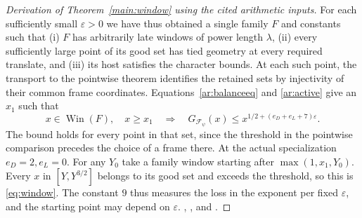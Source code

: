 \begin{proof}[Derivation of Theorem~\ref{main:window} using the cited arithmetic inputs]
For each sufficiently small \(\varepsilon>0\) we have thus obtained a single family \(F\) and constants such that (i) \(F\) has arbitrarily late windows of power length \(\lambda\), (ii) every sufficiently large point of its good set has tied geometry at every required translate, and (iii) its host satisfies the character bounds. At each such point, the transport to the pointwise theorem identifies the retained sets by injectivity of their common frame coordinates. Equations~\eqref{ar:balanceeq} and \eqref{ar:active} give an \(x_1\) such that
\[
  x\in\operatorname{Win}(F),\quad x\ge x_1
       \quad\Longrightarrow\quad
 G_{\mathcal F_\psi}(x)\le x^{1/2+(e_D+e_L+7)\varepsilon}.
\]
The bound holds for every point in that set, since the threshold in the pointwise comparison precedes the choice of a frame there. At the actual specialization \(e_D=2,e_L=0\). For any \(Y_0\) take a family window starting after \(\max(1,x_1,Y_0)\). Every \(x\) in \([Y,Y^{3/2}]\) belongs to its good set and exceeds the threshold, so this is \eqref{eq:window}. The constant \(9\) thus measures the loss in the exponent per fixed \(\varepsilon\), and the starting point may depend on \(\varepsilon\). , ,  and .
\end{proof}
